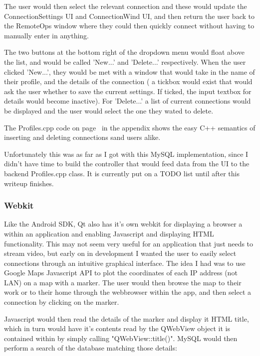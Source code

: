 \documentclass[11pt]{article} %
\begin{document}
The user would then select the relevant connection and these would update the ConnectionSettings UI and ConnectionWind UI, and then return the user back to the RemoteOps window where they could then quickly connect without having to manually enter in anything.

The two buttons at the bottom right of the dropdown menu would float above the list, and would be called 'New...' and 'Delete...' respectively. When the user clicked 'New...', they would be met with a window that would take in the name of their profile, and the details of the connection ( a tickbox would exist that would ask the user whether to save the current settings. If ticked, the input textbox for details would become inactive).  For 'Delete...' a list of current connections would be displayed and the user would select the one they wated to delete.

The Profiles.cpp code on page~\pageref{profiles} in the appendix shows the easy C++ semantics of inserting and deleting connections sand users alike.

Unfortunately this was as far as I got with this MySQL implementation, since I didn't have time to build the controller that would feed data from the UI to the backend Profiles.cpp class. It is currently put on a TODO list until after this writeup finishes.

\subsubsection{Webkit}
Like the Android SDK, Qt also has it's own webkit for displaying a browser a within an application and enabling Javascript and displaying HTML  functionality. This may not seem very useful for an application that just needs to stream video, but early on in development I wanted the user to easily select connections through an intuitive graphical interface.
The idea I had was to use Google Maps Javascript API to plot the coordinates of each IP address (not LAN) on a map with a marker. The user would then browse the map to their work or to their home through the webbrowser within the app, and then select a connection by clicking on the marker.

Javascript would then read the details of the marker and display it HTML title, which in turn would have it's contents read by the QWebView object it is contained within by simply calling "QWebView::title()". MySQL would then perform a search of the database matching those details:\\
\end{document}
